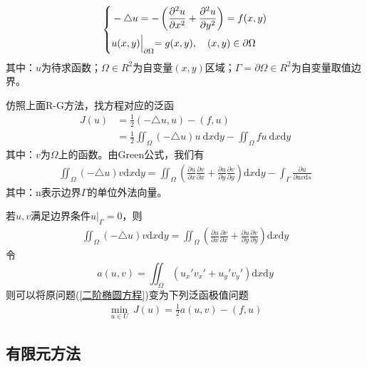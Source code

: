         \begin{align}
            \label{二阶椭圆方程}
            \left\{
            \begin{aligned}
                &-\triangle u = - \left( \frac{\partial^2 u}{\partial x^2} + \frac{\partial^2 u}{\partial y^2} \right) = f(x,y)\\
                &u(x,y)\Bigl|_{\partial\Omega} = g(x,y),\quad (x,y)\in \partial\Omega
            \end{aligned}
            \right.
        \end{align}
        其中：$u$为待求函数；$\Omega\in R^2$为自变量$(x,y)$区域；$\Gamma = \partial\Omega \in R^2$为自变量取值边界。
        \par
        仿照上面R-G方法，找方程对应的泛函
        \begin{align*}
            J(u) &= \frac{1}{2} (-\triangle u, u) - (f,u)\\
            &=\frac{1}{2} \iint_\Omega(-\triangle u) u \ \mathrm{d}x\mathrm{d}y - \iint_\Omega fu \ \mathrm{d}x\mathrm{d}y
        \end{align*}
        其中：$v$为$\Omega$上的函数。由Green公式，我们有
        \begin{align*}
        \iint _\Omega (-\triangle u) v \mathrm{d}x\mathrm{d}y =
        \iint_\Omega(
        \frac{\partial u}{\partial x} \frac{\partial v}{\partial x} +
        \frac{\partial u}{\partial y} \frac{\partial v}{\partial y})
        \mathrm{d}x\mathrm{d}y -
        \int_\Gamma \frac{\partial u}{\partial \mathrm{n} v \mathrm{d}s}
        \end{align*}
        其中：$\mathrm{n}$表示边界$\Gamma$的单位外法向量。
        \par
        若$u,v$满足边界条件$u|_\Gamma = 0$，则
        \begin{align*}
        \iint _\Omega (-\triangle u) v \mathrm{d}x\mathrm{d}y =
        \iint_\Omega(
        \frac{\partial u}{\partial x} \frac{\partial v}{\partial x} +
        \frac{\partial u}{\partial y} \frac{\partial v}{\partial y})
        \mathrm{d}x\mathrm{d}y
        \end{align*}
        令
        \[
            a(u,v) = \iint _\Omega(u_x'v_x' + u_y'v_y')\mathrm{d}x\mathrm{d}y
        \]
        则可以将原问题(\ref{二阶椭圆方程})变为下列泛函极值问题
        \begin{align*}
            \min_{u \in U}\  J(u) = \frac{1}{2}a(u,v) - (f,u)
        \end{align*}

    \subsection{有限元方法}
